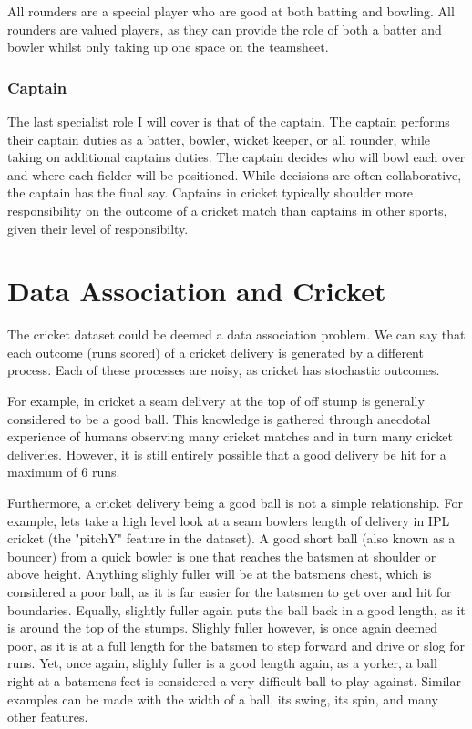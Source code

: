 \documentclass[12pt,a4paper]{report}
\theoremstyle{definition}
\begin{document}
All rounders are a special player who are good at both batting and bowling.
All rounders are valued players, as they can provide the role of both a batter and bowler whilst only taking up one space on the teamsheet.

\subsubsection{Captain}

The last specialist role I will cover is that of the captain. 
The captain performs their captain duties as a batter, bowler, wicket keeper, or all rounder, while taking on additional captains duties.
The captain decides who will bowl each over and where each fielder will be positioned. 
While decisions are often collaborative, the captain has the final say.
Captains in cricket typically shoulder more responsibility on the outcome of a cricket match than captains in other sports, given their level of responsibilty.

\section{Data Association and Cricket}

The cricket dataset could be deemed a data association problem. 
We can say that each outcome (runs scored) of a cricket delivery is generated by a different process. 
Each of these processes are noisy, as cricket has stochastic outcomes. 

For example, in cricket a seam delivery at the top of off stump is generally considered to be a good ball. 
This knowledge is gathered through anecdotal experience of humans observing many cricket matches and in turn many cricket deliveries.
However, it is still entirely possible that a good delivery be hit for a maximum of 6 runs. 

Furthermore, a cricket delivery being a good ball is not a simple relationship. 
For example, lets take a high level look at a seam bowlers length of delivery in IPL cricket (the "pitchY" feature in the dataset).
A good short ball (also known as a bouncer) from a quick bowler is one that reaches the batsmen at shoulder or above height. 
Anything slighly fuller will be at the batsmens chest, which is considered a poor ball, as it is far easier for the batsmen to get over and hit for boundaries.
Equally, slightly fuller again puts the ball back in a good length, as it is around the top of the stumps. 
Slighly fuller however, is once again deemed poor, as it is at a full length for the batsmen to step forward and drive or slog for runs. 
Yet, once again, slighly fuller is a good length again, as a yorker, a ball right at a batsmens feet is considered a very difficult ball to play against. 
Similar examples can be made with the width of a ball, its swing, its spin, and many other features.
\end{document}
